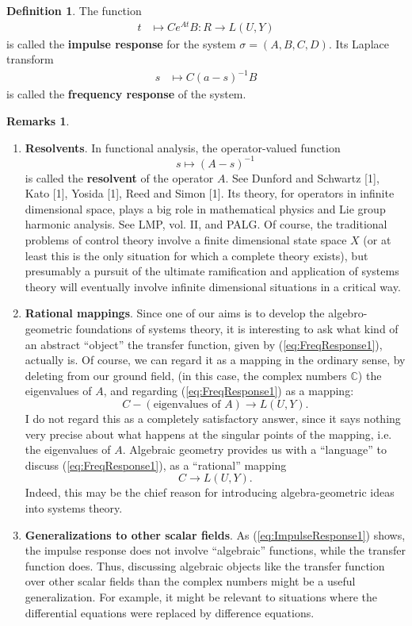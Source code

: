 \documentclass[12pt]{book}
\theoremstyle{plain}
\theoremstyle{definition}
\newtheorem{definition}{Definition}[section]
\newtheorem*{remarks}{Remarks}
\begin{document}
\begin{definition}
    The function
    \begin{align} \label{eq:ImpulseResponse1}
        t &\mapsto Ce^{At}B: R \to L(U, Y)
    \end{align}
    is called the \textbf{impulse response} for the system $\sigma = (A, B, C, D)$.
    Its Laplace transform
    \begin{align} \label{eq:FreqResponse1}
        s &\mapsto C(a-s)^{-1}B
    \end{align}
    is called the \textbf{frequency response} of the system.
\end{definition}

\begin{remarks}
\begin{enumerate}
    \item \textbf{Resolvents}.
    In functional analysis, the operator-valued function
    $$s \mapsto (A-s)^{-1}$$
    is called the \textbf{resolvent} of the operator $A$.
    See Dunford and Schwartz [1], Kato [1], Yosida [1], Reed and Simon [1]. %
    Its theory, for operators in infinite dimensional space, plays a big role in mathematical physics and Lie group harmonic analysis.
    See LMP, vol. II, and PALG.
    Of course, the traditional problems of control theory involve a finite dimensional state space $X$ (or at least this is the only situation for which a complete theory exists), but presumably a pursuit of the ultimate ramification and application of systems theory will eventually involve infinite dimensional situations in a critical way.
    \item \textbf{Rational mappings}.
    Since one of our aims is to develop the algebro-geometric foundations of systems theory, it is interesting to ask what kind of an abstract ``object'' the transfer function, given by (\ref{eq:FreqResponse1}), actually is.
    Of course, we can regard it as a mapping in the ordinary sense, by deleting from our ground field, (in this case, the complex numbers $\mathbb{C}$) the eigenvalues of $A$, and regarding (\ref{eq:FreqResponse1}) as a mapping:
    $$C - (\text{eigenvalues of } A) \to L(U, Y).$$
    I do not regard this as a completely satisfactory answer, since it says nothing very precise about what happens at the singular points of the mapping, i.e. the eigenvalues of $A$.
    Algebraic geometry provides us with a ``language'' to discuss (\ref{eq:FreqResponse1}), as a ``rational'' mapping
    $$C \to L(U, Y).$$
    Indeed, this may be the chief reason for introducing algebra-geometric ideas into systems theory.
    \item \textbf{Generalizations to other scalar fields}.
    As (\ref{eq:ImpulseResponse1}) shows, the impulse response does not involve ``algebraic'' functions, while the transfer function does.
    Thus, discussing algebraic objects like the transfer function over other scalar fields than the complex numbers might be a useful generalization.
    For example, it might be relevant to situations where the differential equations were replaced by difference equations.
\end{enumerate}
\end{remarks}
\end{document}
